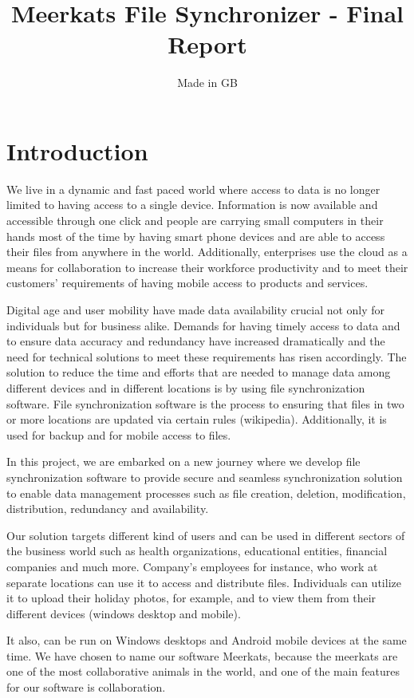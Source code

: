 \documentclass{article}
\title{Meerkats File Synchronizer - Final Report}
\author{Made in GB}
\date{}
\begin{document}
\maketitle{}

\section{Introduction}
We live in a dynamic and fast paced world where access to data is no longer limited to having access to a single device. Information is now available and accessible through one click and people are carrying small computers in their hands most of the time by having smart phone devices and are able to access their files from anywhere in the world. Additionally, enterprises use the cloud as a means for collaboration to increase their workforce productivity and to meet their customers’ requirements of having mobile access to products and services.

Digital age and user mobility have made data availability crucial not only for individuals but for business alike. Demands for having timely access to data and to ensure data accuracy and redundancy have increased dramatically and the need for technical solutions to meet these requirements has risen accordingly. The solution to reduce the time and efforts that are needed to manage data among different devices and in different locations is by using file synchronization software. File synchronization software is the process to ensuring that files in two or more locations are updated via certain rules (wikipedia). Additionally, it is used for backup and for mobile access to files.

\newline
\hfill \break
In this project, we are embarked on a new journey where we develop file synchronization software to provide secure and seamless synchronization solution to enable data management processes such as file creation, deletion, modification, distribution, redundancy and availability.

Our solution targets different kind of users and can be used in different sectors of the business world such as health organizations, educational entities, financial companies and much more. Company’s employees for instance, who work at separate locations can use it to access and distribute files. Individuals can utilize it to upload their holiday photos, for example, and to view them from their different devices (windows desktop and mobile).

It also, can be run on Windows desktops and Android mobile devices at the same time. We have chosen to name our software Meerkats, because the meerkats are one of the most collaborative animals in the world, and one of the main features for our software is collaboration.
\end{document}
